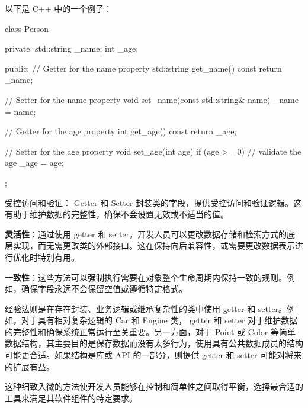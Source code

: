 以下是 C++ 中的一个例子：

\begin{cpp}
class Person {
private:
    std::string _name;
    int _age;

public:
    // Getter for the name property
    std::string get_name() const { return _name; }

    // Setter for the name property
    void set_name(const std::string& name) { _name = name; }

    // Getter for the age property
    int get_age() const { return _age; }

    // Setter for the age property
    void set_age(int age) {
        if (age >= 0) { // validate the age
            _age = age;
        }
    }
};
\end{cpp}


受控访问和验证： Getter 和 Setter 封装类的字段，提供受控访问和验证逻辑。这有助于维护数据的完整性，确保不会设置无效或不适当的值。

\textbf{灵活性}：通过使用 getter 和 setter，开发人员可以更改数据存储和检索方式的底层实现，而无需更改类的外部接口。这在保持向后兼容性，或需要更改数据表示进行优化时特别有用。

\textbf{一致性}：这些方法可以强制执行需要在对象整个生命周期内保持一致的规则。例如，确保字段永远不会保留空值或遵循特定格式。


经验法则是在存在封装、业务逻辑或继承复杂性的类中使用 getter 和 setter。例如，对于具有相对复杂逻辑的 Car 和 Engine 类， getter 和 setter 对于维护数据的完整性和确保系统正常运行至关重要。另一方面，对于 Point 或 Color 等简单数据结构，其主要目的是保存数据而没有太多行为，使用具有公共数据成员的结构可能更合适。如果结构是库或 API 的一部分，则提供 getter 和 setter 可能对将来的扩展有益。

这种细致入微的方法使开发人员能够在控制和简单性之间取得平衡，选择最合适的工具来满足其软件组件的特定要求。


